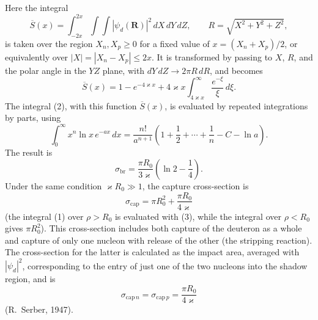 Here the integral
\[
 \overline S(x)=\int_{-2x}^{2x}\!\int\!\int|\psi_d(\mathbf R)|^2\,dX\,dY\,dZ,
 \qquad R=\sqrt{X^2+Y^2+Z^2},
\]
is taken over the region $X_n,X_p\geqslant0$ for a fixed value of $x=(X_n+X_p)/2$, or equivalently over $|X|=|X_n-X_p|\leqslant2x$. It is transformed by passing to $X$, $R$, and the polar angle in the $YZ$ plane, with $dY\,dZ\to2\pi R\,dR$, and becomes
\begin{equation}
 \overline S(x)=1-e^{-4\varkappa x}+4\varkappa x\int_{4\varkappa x}^{\infty}\frac{e^{-\xi}}\xi\,d\xi.
 \tag{3}
\end{equation}
The integral (2), with this function $\overline S(x)$, is evaluated by repeated integrations by parts, using
\[
 \int_0^\infty x^n\ln x\,e^{-ax}\,dx
 =\frac{n!}{a^{n+1}}\left(1+\frac12+\cdots+\frac1n-C-\ln a\right).
\]
The result is
\[
 \sigma_{\mathrm{br}}=\frac{\pi R_0}{3\varkappa}\left(\ln2-\frac14\right).
\]
Under the same condition $\varkappa R_0\gg1$, the capture cross-section is
\[
 \sigma_{\mathrm{cap}}=\pi R_0^2+\frac{\pi R_0}{4\varkappa}
\]
(the integral (1) over $\rho>R_0$ is evaluated with (3), while the integral over $\rho<R_0$ gives $\pi R_0^2$). This cross-section includes both capture of the deuteron as a whole and capture of only one nucleon with release of the other (the stripping reaction). The cross-section for the latter is calculated as the impact area, averaged with $|\psi_d|^2$, corresponding to the entry of just one of the two nucleons into the shadow region, and is
\[
 \sigma_{\mathrm{cap}\,n}=\sigma_{\mathrm{cap}\,p}=\frac{\pi R_0}{4\varkappa}
\]
(R.~Serber, 1947).
